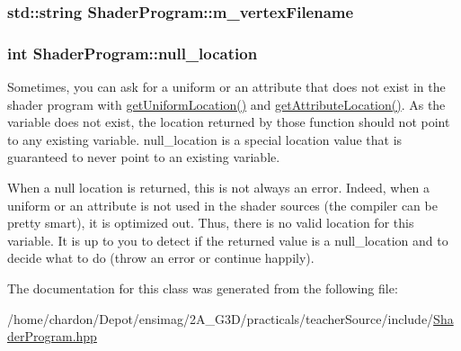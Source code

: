 \hypertarget{classShaderProgram_a2f5d149deaba5b4cd9e925d3860ca078}{
\subsubsection[{m\+\_\+vertex\+Filename}]{\setlength{\rightskip}{0pt plus 5cm}std\+::string Shader\+Program\+::m\+\_\+vertex\+Filename\hspace{0.3cm}{\ttfamily [private]}}}\label{classShaderProgram_a2f5d149deaba5b4cd9e925d3860ca078}
\hypertarget{classShaderProgram_a8e974f0576fc00d5f86ce292ba8921b7}{
\subsubsection[{null\+\_\+location}]{\setlength{\rightskip}{0pt plus 5cm}int Shader\+Program\+::null\+\_\+location\hspace{0.3cm}{\ttfamily [static]}}}\label{classShaderProgram_a8e974f0576fc00d5f86ce292ba8921b7}
Sometimes, you can ask for a uniform or an attribute that does not exist in the shader program with \hyperlink{classShaderProgram_a4f58620a6426bf12a65aa374f6265b96}{get\+Uniform\+Location()} and \hyperlink{classShaderProgram_a189bf49ca91ae75861fed4ef8c72753b}{get\+Attribute\+Location()}. As the variable does not exist, the location returned by those function should not point to any existing variable. {\ttfamily null\+\_\+location} is a special location value that is guaranteed to never point to an existing variable.

When a null location is returned, this is not always an error. Indeed, when a uniform or an attribute is not used in the shader sources (the compiler can be pretty smart), it is optimized out. Thus, there is no valid location for this variable. It is up to you to detect if the returned value is a null\+\_\+location and to decide what to do (throw an error or continue happily). 

The documentation for this class was generated from the following file\+:\begin{DoxyCompactItemize}
\item 
/home/chardon/\+Depot/ensimag/2\+A\+\_\+\+G3\+D/practicals/teacher\+Source/include/\hyperlink{ShaderProgram_8hpp}{Shader\+Program.\+hpp}\end{DoxyCompactItemize}
